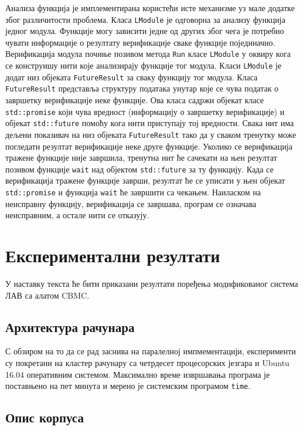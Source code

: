\documentclass[12pt,oneside]{memoir}
\begin{document}
Анализа функција је имплементирана користећи исте механизме уз мале додатке због различитости проблема.   
 Класа \texttt{LModule} је одговорна за анализу функција једног модула. Функције могу зависити једне од других због чега је потребно чувати информације о резултату верификације сваке функције појединачно. Верификација модула почиње позивом метода \texttt{Run} класе \texttt{LModule} у оквиру кога се конструишу нити које анализирају функције тог модула. Класи \texttt{LModule} је додат низ објеката \texttt{FutureResult} за сваку функцију тог модула. Класа \texttt{FutureResult} представља структуру података унутар које се чува податак о завршетку верификације неке функције. Ова класа садржи објекат класе \texttt{std::promise}  који чува вредност (информацију о завршетку верификације) и објекат \texttt{std::future} помоћу кога нити приступају тој вредности. Свака нит има дељени показивач на низ објеката \texttt{FutureResult} тако да у сваком тренутку може погледати резултат верификације неке друге функције. Уколико се верификација тражене функције није завршила, тренутна нит ће сачекати на њен резултат позивом функције \texttt{wait} над објектом \texttt{std::future} за ту функцију. Када се верификација тражене функције заврши, резултат ће се уписати у њен објекат \texttt{std::promise} и функција \texttt{wait} ће завршити са чекањем. Наиласком на неисправну функцију, верификација се завршава, програм се означава неисправним, а остале нити се отказују. 

\chapter{Експериментални резултати}

У наставку текста ће бити приказани резултати поређења модификованог система ЛАВ са алатом CBMC. 
  \section{Архитектура рачунара}
  
  С обзиром на то да се рад заснива на паралелној импмементацији, експерименти су покретани на кластер рачунару са четрдесет процесорских језгара и Ubuntu 16.04 оперативним системом. Максимално време извршавања програма је поставњено на пет минута и мерено је системским програмом \texttt{time}.
  
  \section{Опис корпуса}
  
\end{document}
